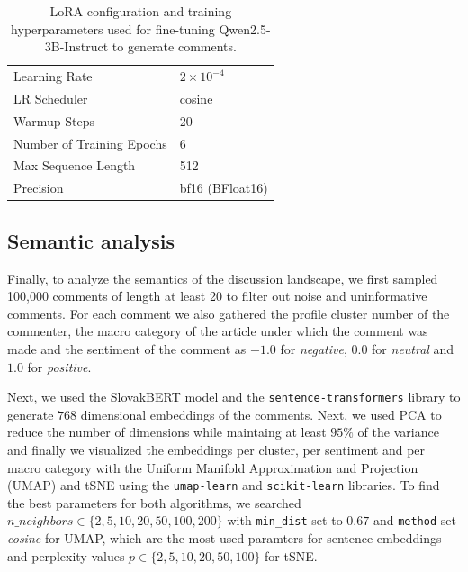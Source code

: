 \documentclass[11pt,a4paper]{article}
\begin{document}
\begin{table}[H]
\begin{tabular}{@{}ll@{}}
		Learning Rate               & $2 \times 10^{-4}$                                                                                                                  \\
		LR Scheduler                & cosine                                                                                                                              \\
		Warmup Steps                & 20                                                                                                                                  \\
		Number of Training Epochs   & 6                                                                                                                                   \\
		Max Sequence Length         & 512                                                                                                                                 \\
		Precision                   & bf16 (BFloat16)                                                                                                                     \\ \bottomrule
	\end{tabular}
	\caption{LoRA configuration and training hyperparameters used for fine-tuning Qwen2.5-3B-Instruct \cite{Yang2024} to generate comments.}
	\label{tab:generative_lora_config}
\end{table}

\vspace{1em}

\subsection{Semantic analysis}
Finally, to analyze the semantics of the discussion landscape, we first sampled 100,000 comments of length at least 20 to filter out noise and uninformative comments. For each comment we also gathered the profile cluster number of the commenter, the macro category of the article under which the comment was made and the sentiment of the comment as $-1.0$ for \textit{negative}, $0.0$ for \textit{neutral} and $1.0$ for \textit{positive}.

Next, we used the SlovakBERT \cite{Pikuliak2022} model and the \texttt{sentence-transformers} \cite{Reimers2019} library to generate $768$ dimensional embeddings of the comments. Next, we used PCA \cite{Pearson1901} to reduce the number of dimensions while maintaing at least $95\%$ of the variance and finally we visualized the embeddings per cluster, per sentiment and per macro category with the Uniform Manifold Approximation and Projection (UMAP) \cite{McInnes2020} and tSNE \cite{Maaten2008} using the \texttt{umap-learn} \cite{McInnes2018} and \texttt{scikit-learn} \cite{Pedregosa2011} libraries. To find the best parameters for both algorithms, we searched $n\_neighbors \in \{2, 5, 10, 20, 50, 100, 200\}$ with \texttt{min\_dist} set to $0.67$ and \texttt{method} set \textit{cosine} for UMAP, which are the most used paramters for sentence embeddings and perplexity values $p \in \{2, 5, 10, 20, 50, 100\}$ for tSNE.
\end{document}
